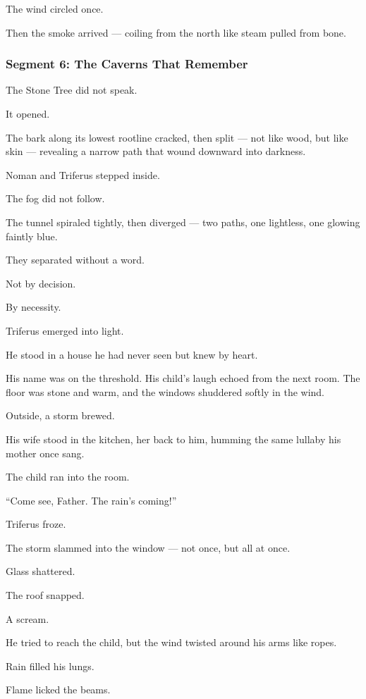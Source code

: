\documentclass[9pt]{article}
\begin{document}
The wind circled once.

Then the smoke arrived — coiling from the north like steam pulled from bone.

\newpage

\subsubsection*{Segment 6: The Caverns That Remember}

The Stone Tree did not speak.

It opened.

The bark along its lowest rootline cracked, then split — not like wood, but like skin — revealing a narrow path that wound downward into darkness.

Noman and Triferus stepped inside.

The fog did not follow.

\bigskip

The tunnel spiraled tightly, then diverged — two paths, one lightless, one glowing faintly blue.

They separated without a word.

Not by decision.

By necessity.

\bigskip

Triferus emerged into light.

He stood in a house he had never seen but knew by heart.

His name was on the threshold. His child’s laugh echoed from the next room. The floor was stone and warm, and the windows shuddered softly in the wind.

Outside, a storm brewed.

His wife stood in the kitchen, her back to him, humming the same lullaby his mother once sang.

The child ran into the room.

“Come see, Father. The rain’s coming!”

Triferus froze.

The storm slammed into the window — not once, but all at once.

Glass shattered.

The roof snapped.

A scream.

He tried to reach the child, but the wind twisted around his arms like ropes.

Rain filled his lungs.

Flame licked the beams.
\end{document}
